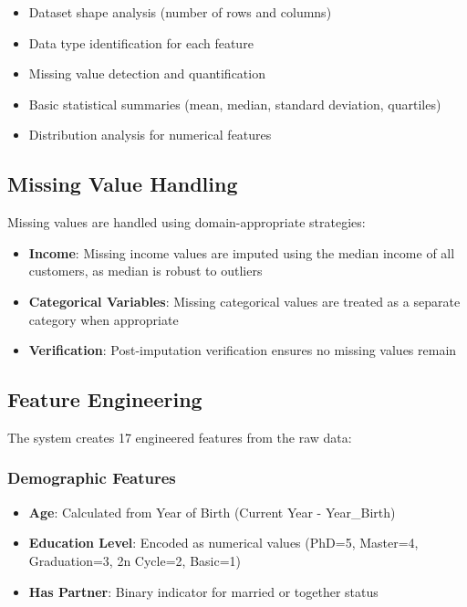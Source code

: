 \documentclass[12pt,a4paper]{report}
\begin{document}
\begin{itemize}
    \item Dataset shape analysis (number of rows and columns)
    \item Data type identification for each feature
    \item Missing value detection and quantification
    \item Basic statistical summaries (mean, median, standard deviation, quartiles)
    \item Distribution analysis for numerical features
\end{itemize}


\subsection{Missing Value Handling}
\noindent Missing values are handled using domain-appropriate strategies:

\begin{itemize}
    \item \textbf{Income}: Missing income values are imputed using the median income of all customers, as median is robust to outliers
    \item \textbf{Categorical Variables}: Missing categorical values are treated as a separate category when appropriate
    \item \textbf{Verification}: Post-imputation verification ensures no missing values remain
\end{itemize}

\subsection{Feature Engineering}
\noindent The system creates 17 engineered features from the raw data:

\subsubsection{Demographic Features}
\begin{itemize}
    \item \textbf{Age}: Calculated from Year of Birth (Current Year - Year\_Birth)
    \item \textbf{Education Level}: Encoded as numerical values (PhD=5, Master=4, Graduation=3, 2n Cycle=2, Basic=1)
    \item \textbf{Has Partner}: Binary indicator for married or together status
\end{itemize}
\end{document}
